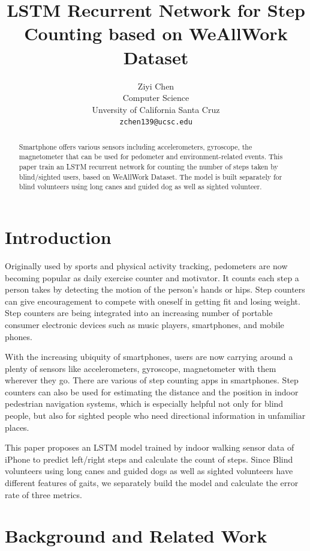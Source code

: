 \documentclass[11pt]{article}
\title{LSTM Recurrent Network for Step Counting based on WeAllWork Dataset}
\author{Ziyi Chen \\
  Computer Science  \\
  Unversity of California Santa Cruz\\
  {\tt zchen139@ucsc.edu}}
\date{}
\begin{document}
\maketitle
\begin{abstract}

Smartphone offers various sensors including accelerometers, gyroscope, the magnetometer that can be used for pedometer and environment-related events. This paper train an LSTM recurrent network for counting the number of steps taken by blind/sighted users, based on WeAllWork Dataset. The model is built separately for blind volunteers using long canes and guided dog as well as sighted volunteer.

\end{abstract}

\section{Introduction}

Originally used by sports and physical activity tracking, pedometers are now becoming popular as daily exercise counter and motivator. It counts each step a person takes by detecting the motion of the person's hands or hips.  Step counters can give encouragement to compete with oneself in getting fit and losing weight. Step counters are being integrated into an increasing number of portable consumer electronic devices such as music players, smartphones, and mobile phones. 

With the increasing ubiquity of smartphones, users are now carrying around a plenty of sensors like accelerometers, gyroscope, magnetometer with them wherever they go. There are various of step counting apps in smartphones. Step counters can also be used for estimating the distance and the position in indoor pedestrian navigation systems, which is especially helpful not only for blind people, but also for sighted people who need directional information in unfamiliar places.

This paper proposes an LSTM model trained by indoor walking sensor data of iPhone to predict left/right steps and calculate the count of steps. Since Blind volunteers using long canes and guided dogs as well as sighted volunteers have different features of gaits, we separately build the model and calculate the error rate of three metrics.



\section{Background and Related Work}
\end{document}
